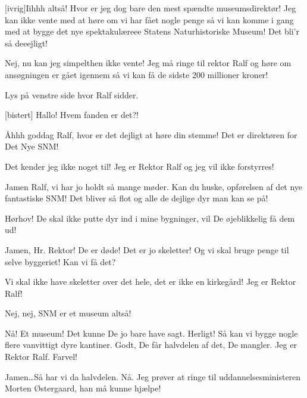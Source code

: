 \documentclass[a4paper,12pt]{article}
\begin{document}
\begin{sketch}

[ivrig]Iihhh altså! Hvor er jeg dog bare den mest spændte museumsdirektør! Jeg kan ikke vente med at høre om vi har fået nogle penge så vi kan komme i gang med at bygge det nye spektakulæreee Statens Naturhistoriske Museum! Det bli'r så deeejligt!


Nej, nu kan jeg simpelthen ikke vente! Jeg må ringe til rektor Ralf og høre om ansøgningen er gået igennem så vi kan få de sidste 200 millioner kroner!


\scene Lys på venstre side hvor Ralf sidder. 

[bistert] Hallo! Hvem fanden er det?!

Åhhh goddag Ralf, hvor er det dejligt at høre din stemme! Det er direktøren for Det Nye SNM!

Det kender jeg ikke noget til! Jeg er Rektor Ralf og jeg vil ikke forstyrres!

 Jamen Ralf, vi har jo holdt så mange møder. Kan du huske, opførelsen af det nye fantastiske  SNM! Det bliver så flot og alle de dejlige dyr man kan se på!

Hørhov! De skal ikke putte dyr ind i mine bygninger, vil De øjeblikkelig få dem ud! 

 Jamen, Hr. Rektor! De er døde! Det er jo skeletter! Og vi skal bruge penge til selve byggeriet! Kan vi få det?

Vi skal ikke have skeletter over det hele, det er ikke en kirkegård! Jeg er Rektor Ralf!

 Nej, nej, SNM er et museum altså!

Nå! Et museum! Det kunne De jo bare have sagt. Herligt! Så kan vi bygge nogle flere vanvittigt dyre kantiner. Godt, De får halvdelen af det, De mangler. Jeg er Rektor Ralf. Farvel!


 Jamen\ldots Så har vi da halvdelen. Nå. Jeg prøver at ringe til uddannelsesministeren Morten Østergaard, han må kunne hjælpe!



\end{sketch}
\end{document}
